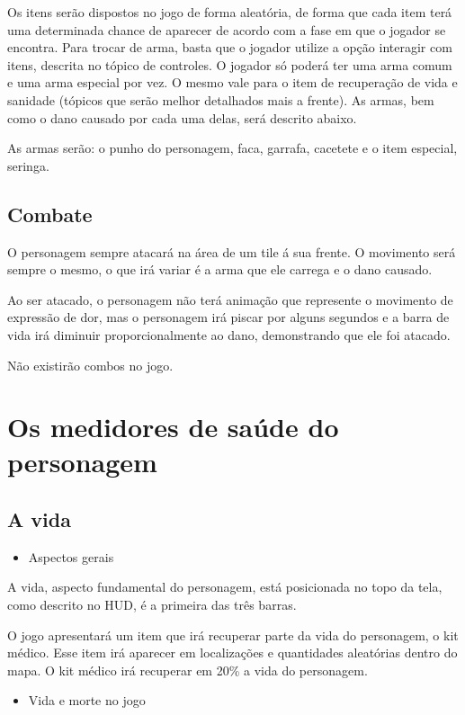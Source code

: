 \documentclass{article}
\begin{document}
Os itens serão dispostos no jogo de forma aleatória, de forma que cada item terá uma determinada chance de aparecer de acordo com a fase em que o jogador se encontra. Para trocar de arma, basta que o jogador utilize a opção interagir com itens, descrita no tópico de controles. O jogador só poderá ter uma arma comum e uma arma especial por vez. O mesmo vale para o item de recuperação de vida e sanidade (tópicos que serão melhor detalhados mais a frente). As armas, bem como o dano causado por cada uma delas, será descrito abaixo.

As armas serão: o punho do personagem, faca, garrafa, cacetete e o item especial, seringa.

\subsection{Combate}
O personagem sempre atacará na área de um tile á sua frente. O movimento será sempre o mesmo, o que irá variar é a arma que ele carrega e o dano causado.

Ao ser atacado, o personagem não terá animação que represente o movimento de expressão de dor, mas o personagem irá piscar por alguns segundos e a barra de vida irá diminuir proporcionalmente ao dano, demonstrando que ele foi atacado.

Não existirão combos no jogo.

\section{Os medidores de saúde do personagem}
\subsection{A vida}
\begin{itemize}
\item Aspectos gerais
\end{itemize}

A vida, aspecto fundamental do personagem, está posicionada no topo da tela, como descrito no HUD, é a primeira das três barras.

O jogo apresentará um item que irá recuperar parte da vida do personagem, o kit  médico. Esse item irá aparecer em localizações e quantidades aleatórias dentro do mapa. O kit médico irá recuperar em 20\% a vida do personagem.

\begin{itemize}
\item Vida e morte no jogo
\end{itemize}
\end{document}
